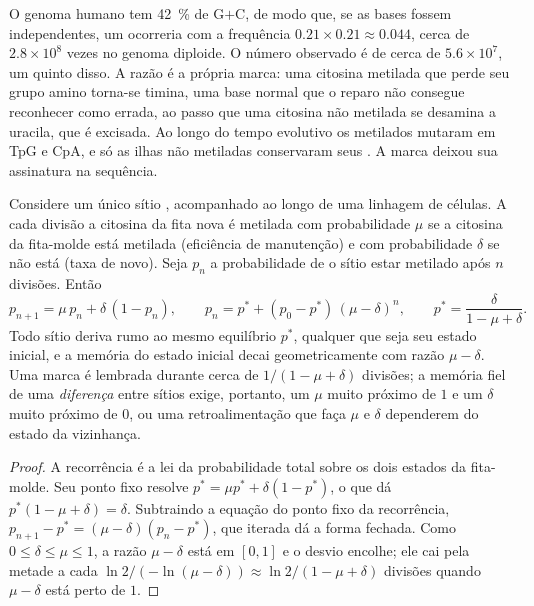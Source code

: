 \begin{example}\label{ex:b3:chromatin-epigenetics:cpg-deficit}
O genoma humano tem \qty{42}{\%} de G$+$C, de modo que, se as bases
fossem independentes, um  ocorreria com a frequência
$0.21\times 0.21 \approx 0.044$, cerca de $2.8\times 10^{8}$ vezes no
genoma diploide.
O número observado é de cerca de $5.6\times 10^{7}$, um quinto disso.
A razão é a própria marca: uma citosina metilada que perde seu grupo
amino torna-se timina, uma base normal que o reparo não consegue
reconhecer como errada, ao passo que uma citosina não metilada se
desamina a uracila, que é excisada. Ao longo do tempo evolutivo os
 metilados mutaram em TpG e CpA, e só as ilhas não metiladas
conservaram seus . A marca deixou sua assinatura na sequência.
\end{example}

\begin{theorem}\label{thm:b3:chromatin-epigenetics:maintenance}
Considere um único sítio , acompanhado ao longo de uma linhagem de
células. A cada divisão a citosina da fita nova é metilada com
probabilidade $\mu$ se a citosina da fita-molde está metilada
(eficiência de manutenção) e com probabilidade $\delta$ se não está
(taxa de novo). Seja $p_{n}$ a probabilidade de o sítio estar metilado
após $n$ divisões. Então
\[
p_{n+1} = \mu\, p_{n} + \delta\,(1 - p_{n}),
\qquad
p_{n} = p^{*} + (p_{0} - p^{*})\,(\mu - \delta)^{n},
\qquad
p^{*} = \frac{\delta}{1 - \mu + \delta}.
\]
Todo sítio deriva rumo ao mesmo equilíbrio $p^{*}$, qualquer que seja
seu estado inicial, e a memória do estado inicial decai
geometricamente com razão $\mu - \delta$. Uma marca é lembrada durante
cerca de $1/(1 - \mu + \delta)$ divisões; a memória fiel de uma
\emph{diferença} entre sítios exige, portanto, um $\mu$ muito próximo
de $1$ e um $\delta$ muito próximo de $0$, ou uma retroalimentação que
faça $\mu$ e $\delta$ dependerem do estado da vizinhança.
\end{theorem}
\begin{proof}
A recorrência é a lei da probabilidade total sobre os dois estados da
fita-molde. Seu ponto fixo resolve $p^{*} = \mu p^{*} + \delta(1 -
p^{*})$, o que dá $p^{*}(1 - \mu + \delta) = \delta$. Subtraindo a
equação do ponto fixo da recorrência, $p_{n+1} - p^{*} = (\mu -
\delta)(p_{n} - p^{*})$, que iterada dá a forma fechada. Como
$0 \le \delta \le \mu \le 1$, a razão $\mu - \delta$ está em $[0,1]$ e
o desvio encolhe; ele cai pela metade a cada $\ln 2 / (-\ln(\mu -
\delta)) \approx \ln 2/(1 - \mu + \delta)$ divisões quando $\mu -
\delta$ está perto de $1$.
\end{proof}

